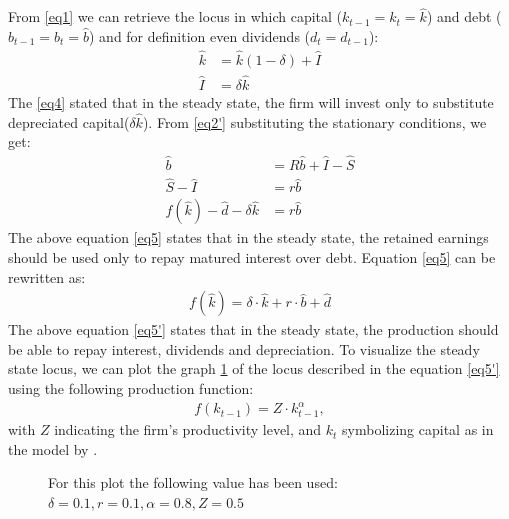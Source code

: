 \documentclass[12pt]{article}
\begin{document}
From \ref{eq1} we can retrieve the locus in which capital (\(k_{t-1}=k_{t}=\widehat{k}\)) and debt (\(b_{t-1}=b_{t} = \widehat{b}\))
 and  for definition even dividends (\(d_t=d_{t-1} \)):
\begin{align}
    \widehat{k}&=\widehat{k}\left(1-\delta\right) + \widehat{I}\\
    \widehat{I}&=\delta \widehat{k}  \label{eq4}
\end{align}
The \ref{eq4} stated that in the steady state, the firm will invest only to substitute depreciated capital(\(\delta \widehat{k}\)). From \ref{eq2'} substituting the stationary conditions, we get:
\begin{align}
    \widehat{b} &= R \widehat{b} + \widehat{I} - \widehat{S} \\
    \widehat{S} - \widehat{I} &= r \widehat{b} \\
    f\left(\widehat{k}\right) - \widehat{d} - \delta \widehat{k} &= r \widehat{b} \label{eq5}
\end{align}
The above equation \ref{eq5} states that in the steady state, the retained earnings should be used only to repay matured
interest over debt.
Equation \ref{eq5} can be rewritten as:
\begin{align}
    f(\widehat{k}) = \delta \cdot \widehat{k} + r \cdot \widehat{b} + \widehat{d} \label{eq5'}
\end{align}
The above equation \ref{eq5'} states that in the steady state, the production should be able to repay interest,
dividends and depreciation. 
To visualize the steady state locus, we can plot the graph \ref{fig:steadystate3d} of the locus described in the
equation \ref{eq5'} using the following production function:
\begin{align}
    f(k_{t-1}) = Z \cdot k_{t-1}^\alpha, \label{eq6} 
\end{align}
 with \(Z\) indicating the firm's productivity level, and \(k_t\) symbolizing capital as in the model by
 \cite{CabHarm94}.  

\begin{figure}
    \centering
    
    \caption{For this plot the following value has been used: \(\delta =0.1, r=0.1, \alpha=0.8, Z=0.5\)}
    \label{fig:steadystate3d}
\end{figure}
\end{document}
